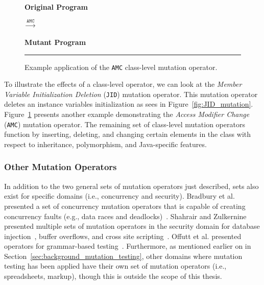 \begin{figure}[!tb]
  \centering
  \begin{minipage}{6.5cm}
  \centering
  \footnotesize{\textbf{Original Program}}
  
  \end{minipage}
  $\xrightarrow{\texttt{AMC}}$
  \begin{minipage}{6.5cm}
  \centering
  \footnotesize{\textbf{Mutant Program}}
  
  \end{minipage}
  \caption{Example application of the \texttt{AMC} class-level mutation operator.}
  \vspace{2mm}
  \hrule
  \label{fig:AMC_mutation}
\end{figure}

To illustrate the effects of a class-level operator, we can look at the \emph{Member Variable Initialization Deletion} (\texttt{JID}) mutation operator. This mutation operator deletes an instance variables initialization as sees in Figure~\ref{fig:JID_mutation}. Figure~\ref{fig:AMC_mutation} presents another example demonstrating the \emph{Access Modifier Change} (\texttt{AMC}) mutation operator. The remaining set of class-level mutation operators function by inserting, deleting, and changing certain elements in the class with respect to inheritance, polymorphism, and Java-specific features.


\subsubsection{Other Mutation Operators}
\label{subsubsec:background_other_operators}
In addition to the two general sets of mutation operators just described, sets also exist for specific domains (i.e., concurrency and security). Bradbury et al. presented a set of concurrency mutation operators that is capable of creating concurrency faults (e.g., data races and deadlocks)~\cite{BCD06}. Shahrair and Zulkernine presented multiple sets of mutation operators in the security domain for database injection~\cite{SZ08b}, buffer overflows\cite{SZ08}, and cross site scripting~\cite{SZ08a}. Offutt et al. presented operators for grammar-based testing~\cite{OAL06}. Furthermore, as mentioned earlier on in Section~\ref{sec:background_mutation_testing}, other domains where mutation testing has been applied have their own set of mutation operators (i.e., spreadsheets, markup), though this is outside the scope of this thesis.


